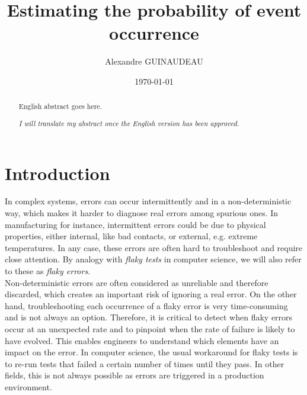 \documentclass{kththesis}
\title{Estimating the probability of event occurrence}
\author{Alexandre GUINAUDEAU}
\date{\today}
\begin{document}
\frontmatter

\titlepage

\begin{abstract}
  English abstract goes here.

\end{abstract}


\begin{otherlanguage}{swedish}
  \begin{abstract}
    \emph{I will translate my abstract once the English version has been approved.}
  \end{abstract}
\end{otherlanguage}


\tableofcontents


\mainmatter

%
%


\chapter*{Introduction}

In complex systems, errors can occur intermittently and in a non-deterministic way, which makes it harder to diagnose real errors among spurious ones. 
In manufacturing for instance, intermittent errors could be due to physical properties, either internal, like bad contacts, or external, e.g. extreme temperatures.
In any case, these errors are often hard to troubleshoot and require close attention. By analogy with \emph{flaky tests} in computer science, we will also refer to these as \emph{flaky errors}.\\

Non-deterministic errors are often considered as unreliable and therefore discarded, which creates an important risk of ignoring a real error. On the other hand, troubleshooting each occurrence of a flaky error is very time-consuming and is not always an option. Therefore, it is critical to detect when flaky errors occur at an unexpected rate and to pinpoint when the rate of failure is likely to have evolved. This enables engineers to understand which elements have an impact on the error. In computer science, the usual workaround for flaky tests is to re-run tests that failed a certain number of times until they pass. In other fields, this is not always possible as errors are triggered in a production environment.\\
\end{document}

